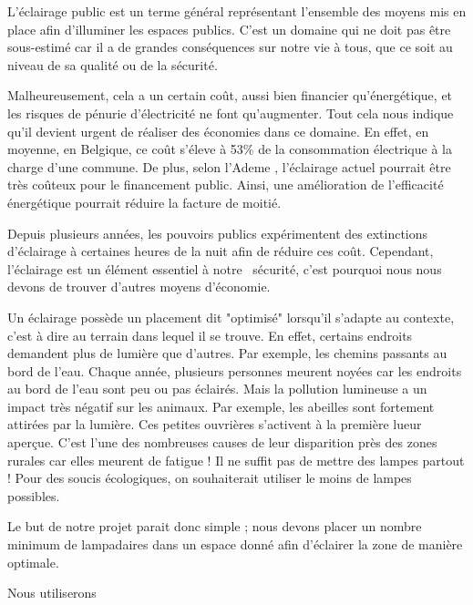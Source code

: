  
 
L'\'eclairage public est un terme g\'en\'eral repr\'esentant l'ensemble des moyens mis en place afin d'illuminer les espaces publics. C'est un domaine qui ne doit pas \^etre sous-estim\'e car il a de grandes cons\'equences sur notre vie \`a tous, que ce soit au niveau de sa qualit\'e ou de la s\'ecurit\'e. \cite{projwebsite}

 
 

Malheureusement, cela a un certain co\^ut, aussi bien financier qu'\'energ\'etique, et  les risques de p\'enurie d'\'electricit\'e ne font qu'augmenter. Tout cela nous indique qu'il devient urgent de r\'ealiser des \'economies dans ce domaine. En effet, en moyenne, en Belgique, ce co\^ut  s'\'eleve \`a 53\% de la consommation \'electrique \`a la charge d'une commune. De plus, selon l'Ademe \cite{ademe}, l'\'eclairage actuel pourrait \^etre tr\`es co\^uteux pour le financement public. Ainsi, une am\'elioration de l'efficacit\'e \'energ\'etique pourrait r\'eduire la facture de moiti\'e.




Depuis plusieurs ann\'ees, les pouvoirs publics exp\'erimentent des extinctions d'\'eclairage \`a certaines heures de la nuit afin de r\'eduire ces co\^ut. Cependant, l'\'eclairage est un \'el\'ement essentiel \`a notre \ s\'ecurit\'e, c'est pourquoi nous nous devons de trouver d'autres moyens d'\'economie.




Un \'eclairage poss\`ede un placement dit "optimis\'e" lorsqu'il s'adapte au contexte, c'est à dire au terrain dans lequel il se trouve. En effet, certains endroits demandent plus de lumi\`ere que d'autres. Par exemple, les chemins passants au bord de l'eau. Chaque ann\'ee, plusieurs personnes meurent noy\'ees car les endroits au bord de l'eau sont peu ou pas \'eclair\'es. Mais la pollution lumineuse a un impact tr\`es n\'egatif sur les animaux. Par exemple, les abeilles sont fortement attir\'ees par la lumi\`ere. Ces petites ouvri\`eres s'activent à la premi\`ere lueur aperçue. C'est l'une des nombreuses causes de leur disparition pr\`es des zones rurales car elles meurent de fatigue ! Il ne suffit pas de mettre des lampes partout ! Pour des soucis écologiques, on souhaiterait utiliser le moins de lampes possibles.




Le but de notre projet parait donc simple ; nous devons placer un nombre minimum de lampadaires dans un espace donné afin d'éclairer la zone de manière optimale.



Nous utiliserons